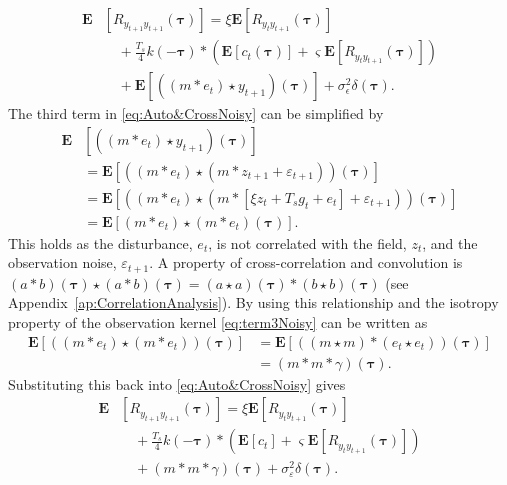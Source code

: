 \documentclass[10pt,twocolumn,twoside]{IEEEtran}
\begin{document}
\begin{align}\label{eq:Auto&CrossNoisy}
	\mathbf{E}&[R_{y_{t+1}y_{t+1}}(\boldsymbol{\tau})] = \xi \mathbf{E}[R_{y_ty_{t+1}}(\boldsymbol{\tau})] \nonumber \\
	&\quad+  \frac{T_s}{4} k(-\boldsymbol\tau) \ast (\mathbf{E}\left[c_t(\boldsymbol\tau)\right] + \varsigma \mathbf{E}\left[R_{y_ty_{t+1}}(\boldsymbol\tau)\right] ) \nonumber \\
	&\quad+\mathbf{E}[((m\ast e_t)\star y_{t+1})(\boldsymbol\tau)]+\sigma_{\epsilon}^2\delta(\boldsymbol{\tau}).
\end{align}
The third term in \eqref{eq:Auto&CrossNoisy} can be simplified by 
\begin{align}\label{eq:term3Noisy}
\mathbf{E}&[((m\ast e_t)\star y_{t+1})(\boldsymbol\tau)] \nonumber \\
  &=\mathbf{E}[((m\ast e_t)\star (m\ast z_{t+1}+\varepsilon_{t+1})) (\boldsymbol\tau)] \nonumber \\
	&= \mathbf{E}[(\left(m \ast e_t\right) \star (m \ast [\xi z_t+ T_s g_t + e_t]+\varepsilon_{t+1}))(\boldsymbol\tau)] \nonumber \\
	&=\mathbf{E}[\left(m \ast e_t\right)\star\left(m \ast e_t\right)(\boldsymbol\tau)].
\end{align} 
This holds as the disturbance, $e_t$, is not correlated with the field, $z_t$, and the observation noise, $\varepsilon_{t+1}$.
A property of cross-correlation and convolution is $(a \ast b)(\boldsymbol\tau) \star (a \ast b)(\boldsymbol\tau)=(a \star a)(\boldsymbol\tau)\ast(b \star b)(\boldsymbol\tau)$ (see Appendix~\ref{ap:CorrelationAnalysis}).
By using this relationship and the isotropy property of the observation kernel \eqref{eq:term3Noisy} can be written as
\begin{align}\label{eq:EM-Autoterm4}
\mathbf{E}[(\left(m \ast e_t\right)\star\left(m \ast e_t\right))(\boldsymbol\tau)]&=\mathbf{E}[(\left(m \star m\right)\ast\left(e_t \star e_t\right))(\boldsymbol\tau)] \nonumber \\
&=(m\ast m \ast \gamma)(\boldsymbol\tau).
\end{align}
Substituting this back into \eqref{eq:Auto&CrossNoisy}  gives
\begin{align}
	\mathbf{E}&[R_{y_{t+1}y_{t+1}}(\boldsymbol{\tau})] = \xi \mathbf{E}[R_{y_ty_{t+1}}(\boldsymbol{\tau})] \nonumber \\
	&\quad+  \frac{T_s}{4} k(-\boldsymbol\tau) \ast (\mathbf{E}\left[c_t\right] + \varsigma \mathbf{E}\left[R_{y_ty_{t+1}}(\boldsymbol\tau)\right] ) \nonumber \\
	&\quad+(m\ast m \ast \gamma)(\boldsymbol\tau)+\sigma_{\varepsilon}^2\delta(\boldsymbol{\tau}).
\end{align}
\end{document}
